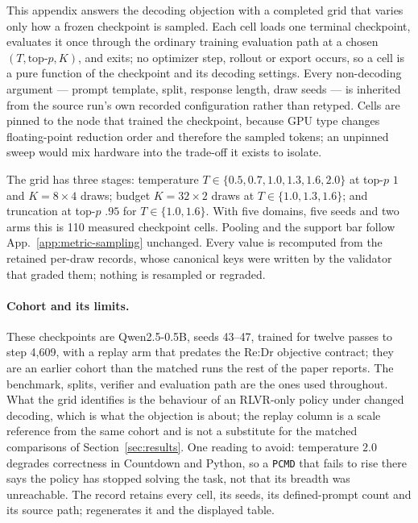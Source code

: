 \documentclass{article}
\newcommand{\1}{\mathbf 1}
\newcommand{\pmd}{\texttt{PCMD}}
\theoremstyle{remark}
\theoremstyle{definition}
\theoremstyle{plain}
\begin{document}
This appendix answers the decoding objection with a completed
grid that varies only how a frozen checkpoint is sampled. Each cell loads one
terminal checkpoint, evaluates it once through the ordinary training evaluation
path at a chosen $(T,\text{top-}p,K)$, and exits; no optimizer step, rollout or
export occurs, so a cell is a pure function of the checkpoint and its decoding
settings. Every non-decoding argument --- prompt template, split, response
length, draw seeds --- is inherited from the source run's own recorded
configuration rather than retyped. Cells are pinned to the node that trained
the checkpoint, because GPU type changes floating-point reduction order and
therefore the sampled tokens; an unpinned sweep would mix hardware into the
trade-off it exists to isolate.

The grid has three stages: temperature $T\in\{0.5,0.7,1.0,1.3,1.6,2.0\}$ at
top-$p$ $1$ and $K=8\times4$ draws; budget $K=32\times2$ draws at
$T\in\{1.0,1.3,1.6\}$; and truncation at top-$p$ $.95$ for $T\in\{1.0,1.6\}$.
With five domains, five seeds and two arms this is 110 measured checkpoint
cells. Pooling and the support bar follow App.~\ref{app:metric-sampling}
unchanged. Every value is recomputed from the retained per-draw
records, whose canonical keys were written by the validator that graded them;
nothing is resampled or regraded.

\paragraph{Cohort and its limits.}
These checkpoints are Qwen2.5-0.5B, seeds 43--47, trained for twelve passes to
step 4,609, with a replay arm that predates the Re:Dr objective contract; they
are an earlier cohort than the matched runs the rest of the paper reports. The benchmark, splits, verifier and evaluation path are the ones used
throughout. What the grid identifies is the behaviour of an RLVR-only
policy under changed decoding, which is what the objection is about; the
replay column is a scale reference from the same cohort and is not a substitute
for the matched comparisons of Section~\ref{sec:results}. One reading to avoid:
temperature $2.0$ degrades correctness in Countdown and Python, so a \pmd{}
that fails to rise there says the policy has stopped solving the task, not that
its breadth was unreachable. The record
 retains every cell, its seeds,
its defined-prompt count and its source path;
 regenerates it and the displayed
table.
\end{document}
